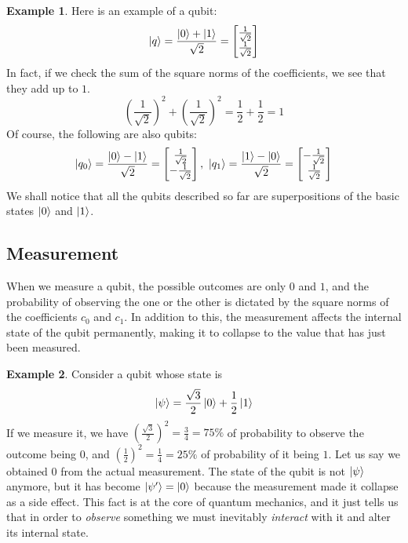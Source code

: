 \documentclass[12pt,a4paper]{report}
\theoremstyle{definition}
\theoremstyle{definition}
\newtheorem{example}{Example}[section]
\theoremstyle{definition}
\begin{document}
\begin{example}
Here is an example of a qubit:
\begin{equation*}
    \ket{q}=\frac{\ket{0}+\ket{1}}{\sqrt{2}}=\begin{bmatrix}
        \frac{1}{\sqrt{2}}\\
        \frac{1}{\sqrt{2}}
    \end{bmatrix}
\end{equation*}
In fact, if we check the sum of the square norms of the coefficients, we see that they add up to $1$.
\begin{equation*}
    \left(\frac{1}{\sqrt{2}}\right)^2+\left(\frac{1}{\sqrt{2}}\right)^2=\frac{1}{2}+\frac{1}{2}=1
\end{equation*}
Of course, the following are also qubits:
\begin{equation*}
    \ket{q_0}=\frac{\ket{0}-\ket{1}}{\sqrt{2}}=\begin{bmatrix}
        \frac{1}{\sqrt{2}}\\
        -\frac{1}{\sqrt{2}}
    \end{bmatrix},\ 
    \ket{q_1}=\frac{\ket{1}-\ket{0}}{\sqrt{2}}=\begin{bmatrix}
        -\frac{1}{\sqrt{2}}\\
        \frac{1}{\sqrt{2}}
    \end{bmatrix}
\end{equation*}
We shall notice that all the qubits described so far are superpositions of the basic states $\ket{0}$ and $\ket{1}$.
\end{example}



\subsection{Measurement}
When we measure a qubit, the possible outcomes are only $0$ and $1$, and the probability of observing the one or the other is dictated by the square norms of the coefficients $c_0$ and $c_1$. In addition to this, the measurement affects the internal state of the qubit permanently, making it to collapse to the value that has just been measured.
\begin{example}
Consider a qubit whose state is
\begin{equation*}
    \ket{\psi}=\frac{\sqrt{3}}{2}\ket{0}+\frac{1}{2}\ket{1}
\end{equation*}
If we measure it, we have $\left(\frac{\sqrt{3}}{2}\right)^2=\frac{3}{4}=75\%$ of probability to observe the outcome being $0$, and $\left(\frac{1}{2}\right)^2=\frac{1}{4}=25\%$ of probability of it being $1$. Let us say we obtained $0$ from the actual measurement. The state of the qubit is not $\ket{\psi}$ anymore, but it has become $\ket{\psi'}=\ket{0}$ because the measurement made it collapse as a side effect. This fact is at the core of quantum mechanics, and it just tells us that in order to \emph{observe} something we must inevitably \emph{interact} with it and alter its internal state.
\end{example}
\end{document}
